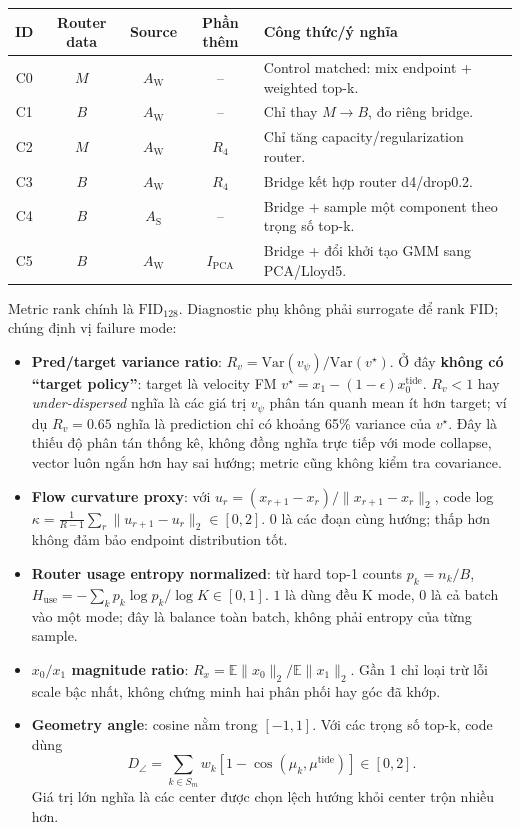 \documentclass[11pt,a4paper]{article}
\newcommand{\fid}{\mathrm{FID}}
\begin{document}
\begin{center}
\small
\setlength{\tabcolsep}{4pt}
\begin{tabularx}{\linewidth}{@{}c c c c Y@{}}
\toprule
\textbf{ID} & \textbf{Router data} & \textbf{Source} & \textbf{Phần thêm} & \textbf{Công thức/ý nghĩa}\\
\midrule
C0 & \(M\) & \(A_{\mathrm W}\) & -- & Control matched: mix endpoint + weighted top-k.\\
C1 & \(B\) & \(A_{\mathrm W}\) & -- & Chỉ thay \(M\to B\), đo riêng bridge.\\
C2 & \(M\) & \(A_{\mathrm W}\) & \(R_4\) & Chỉ tăng capacity/regularization router.\\
C3 & \(B\) & \(A_{\mathrm W}\) & \(R_4\) & Bridge kết hợp router d4/drop0.2.\\
C4 & \(B\) & \(A_{\mathrm S}\) & -- & Bridge + sample một component theo trọng số top-k.\\
C5 & \(B\) & \(A_{\mathrm W}\) & \(I_{\mathrm{PCA}}\) & Bridge + đổi khởi tạo GMM sang PCA/Lloyd5.\\
\bottomrule
\end{tabularx}
\end{center}

Metric rank chính là \(\fid_{128}\). Diagnostic phụ không phải surrogate để rank FID; chúng định vị failure mode:
\begin{itemize}
  \item \textbf{Pred/target variance ratio}: \(R_v=\mathrm{Var}(v_\psi)/\mathrm{Var}(v^\star)\). Ở đây \textbf{không có ``target policy''}: target là velocity FM \(v^\star=x_1-(1-\epsilon)x_0^{\mathrm{tide}}\). \(R_v<1\) hay \emph{under-dispersed} nghĩa là các giá trị \(v_\psi\) phân tán quanh mean ít hơn target; ví dụ \(R_v=0.65\) nghĩa là prediction chỉ có khoảng 65\% variance của \(v^\star\). Đây là thiếu độ phân tán thống kê, không đồng nghĩa trực tiếp với mode collapse, vector luôn ngắn hơn hay sai hướng; metric cũng không kiểm tra covariance.
  \item \textbf{Flow curvature proxy}: với \(u_r=(x_{r+1}-x_r)/\|x_{r+1}-x_r\|_2\), code log \(\kappa=\frac1{R-1}\sum_r\|u_{r+1}-u_r\|_2\in[0,2]\). \(0\) là các đoạn cùng hướng; thấp hơn không đảm bảo endpoint distribution tốt.
  \item \textbf{Router usage entropy normalized}: từ hard top-1 counts \(p_k=n_k/B\), \(H_{\mathrm{use}}=-\sum_kp_k\log p_k/\log K\in[0,1]\). \(1\) là dùng đều K mode, \(0\) là cả batch vào một mode; đây là balance toàn batch, không phải entropy của từng sample.
  \item \textbf{\(x_0/x_1\) magnitude ratio}: \(R_x=\mathbb E\|x_0\|_2/\mathbb E\|x_1\|_2\). Gần 1 chỉ loại trừ lỗi scale bậc nhất, không chứng minh hai phân phối hay góc đã khớp.
  \item \textbf{Geometry angle}: cosine nằm trong \([-1,1]\). Với các trọng số top-k, code dùng
  \[
    D_\angle=\sum_{k\in S_m}w_k[1-\cos(\mu_k,\mu^{\mathrm{tide}})]\in[0,2].
  \]
  Giá trị lớn nghĩa là các center được chọn lệch hướng khỏi center trộn nhiều hơn.
\end{itemize}
\end{document}
